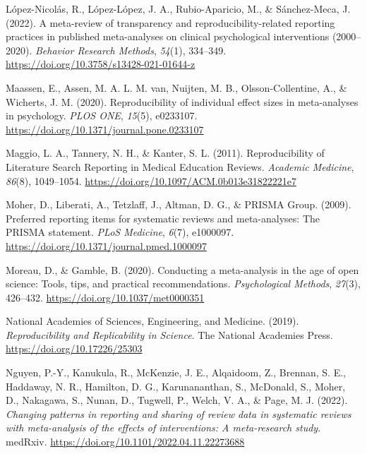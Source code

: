 \documentclass[
  ,man,floatsintext]{apa6}
\newlength{\cslhangindent}
\newlength{\cslentryspacingunit} %
\newenvironment{CSLReferences}[2] %
 {%
  \setlength{\parindent}{0pt}
  \ifodd #1
  \let\oldpar\par
  \def\par{\hangindent=\cslhangindent\oldpar}
  \fi
  \setlength{\parskip}{#2\cslentryspacingunit}
 }%
 {}
\begin{document}
\begin{CSLReferences}{1}{0}
\leavevmode{}%
López-Nicolás, R., López-López, J. A., Rubio-Aparicio, M., \& Sánchez-Meca, J. (2022). A meta-review of transparency and reproducibility-related reporting practices in published meta-analyses on clinical psychological interventions (2000--2020). \emph{Behavior Research Methods}, \emph{54}(1), 334--349. \url{https://doi.org/10.3758/s13428-021-01644-z}

\leavevmode{}%
Maassen, E., Assen, M. A. L. M. van, Nuijten, M. B., Olsson-Collentine, A., \& Wicherts, J. M. (2020). Reproducibility of individual effect sizes in meta-analyses in psychology. \emph{PLOS ONE}, \emph{15}(5), e0233107. \url{https://doi.org/10.1371/journal.pone.0233107}

\leavevmode{}%
Maggio, L. A., Tannery, N. H., \& Kanter, S. L. (2011). Reproducibility of {Literature} {Search} {Reporting} in {Medical} {Education} {Reviews}. \emph{Academic Medicine}, \emph{86}(8), 1049--1054. \url{https://doi.org/10.1097/ACM.0b013e31822221e7}

\leavevmode{}%
Moher, D., Liberati, A., Tetzlaff, J., Altman, D. G., \& PRISMA Group. (2009). Preferred reporting items for systematic reviews and meta-analyses: The {PRISMA} statement. \emph{PLoS Medicine}, \emph{6}(7), e1000097. \url{https://doi.org/10.1371/journal.pmed.1000097}

\leavevmode{}%
Moreau, D., \& Gamble, B. (2020). Conducting a meta-analysis in the age of open science: Tools, tips, and practical recommendations. \emph{Psychological Methods}, \emph{27}(3), 426--432. \url{https://doi.org/10.1037/met0000351}

\leavevmode{}%
National Academies of Sciences, Engineering, and Medicine. (2019). \emph{Reproducibility and {Replicability} in {Science}}. {The National Academies Press}. \url{https://doi.org/10.17226/25303}

\leavevmode{}%
Nguyen, P.-Y., Kanukula, R., McKenzie, J. E., Alqaidoom, Z., Brennan, S. E., Haddaway, N. R., Hamilton, D. G., Karunananthan, S., McDonald, S., Moher, D., Nakagawa, S., Nunan, D., Tugwell, P., Welch, V. A., \& Page, M. J. (2022). \emph{Changing patterns in reporting and sharing of review data in systematic reviews with meta-analysis of the effects of interventions: A meta-research study}. medRxiv. \url{https://doi.org/10.1101/2022.04.11.22273688}


\end{CSLReferences}
\end{document}
